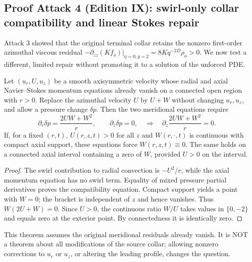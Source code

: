 \subsection*{Proof Attack 4 (Edition IX): swirl-only collar compatibility and linear Stokes repair}
\label{subsec:n1-swirl-compatibility-edition-IX}
Attack 3 showed that the original terminal collar retains the nonzero
first-order azimuthal viscous residual
$-\partial_{zz}(Kf_o)|_{\eta=0,y=2}
=8Kq^{-2D}\rho_o>0$. We now test a different, limited
repair without promoting it to a solution of the unforced PDE.

\begin{theorem}
Let $(u_r,U,u_z)$ be a smooth axisymmetric velocity whose radial
and axial Navier--Stokes momentum equations already vanish on a
connected open region with $r>0$. Replace the azimuthal velocity
$U$ by $U+W$ without changing $u_r,u_z$, and allow a pressure
change $\delta p$. Then the two meridional equations require
\[
\partial_r\delta p=\frac{2UW+W^2}{r},
\qquad\partial_z\delta p=0,
\quad\Longrightarrow\quad
\partial_z\frac{2UW+W^2}{r}=0.
\]
If, for a fixed $(r,t)$, $U(r,z,t)>0$ for all $z$ and
$W(r,\cdot,t)$ is continuous with compact axial support,
these equations force $W(r,z,t)\equiv0$. The same holds on
a connected axial interval containing a zero of $W$,
provided $U>0$ on the interval.
\end{theorem}
\begin{proof}
The swirl contribution to radial convection is $-U^2/r$,
while the axial momentum equation has no swirl term.
Equality of mixed pressure partial derivatives proves the
compatibility equation. Compact support yields a point with
$W=0$; the bracket is independent of $z$ and hence vanishes.
Thus $W(2U+W)=0$. Since $U>0$, the continuous ratio $W/U$
takes values in $\{0,-2\}$ and equals zero at the exterior
point. By connectedness it is identically zero.
\end{proof}
This theorem assumes the original meridional residuals
already vanish. It is NOT a theorem about all modifications
of the source collar; allowing nonzero corrections to $u_r$
or $u_z$, or altering the leading profile, changes the question.

